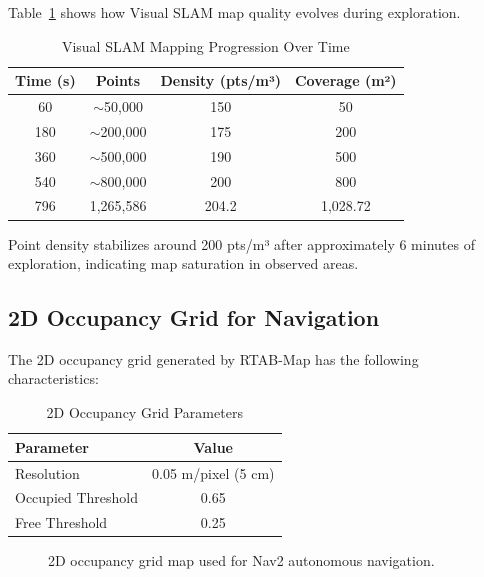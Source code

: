 \documentclass[conference]{IEEEtran}
\begin{document}
Table~\ref{tab:progression} shows how Visual SLAM map quality evolves during exploration.

\begin{table}[htbp]
\caption{Visual SLAM Mapping Progression Over Time}
\begin{center}
\begin{tabular}{|c|c|c|c|}
\hline
\textbf{Time (s)} & \textbf{Points} & \textbf{Density (pts/m³)} & \textbf{Coverage (m²)} \\
\hline
60 & $\sim$50,000 & 150 & 50 \\
180 & $\sim$200,000 & 175 & 200 \\
360 & $\sim$500,000 & 190 & 500 \\
540 & $\sim$800,000 & 200 & 800 \\
796 & 1,265,586 & 204.2 & 1,028.72 \\
\hline
\end{tabular}
\label{tab:progression}
\end{center}
\end{table}

Point density stabilizes around 200 pts/m³ after approximately 6 minutes of exploration, indicating map saturation in observed areas.

\subsection{2D Occupancy Grid for Navigation}

The 2D occupancy grid generated by RTAB-Map has the following characteristics:

\begin{table}[htbp]
\caption{2D Occupancy Grid Parameters}
\begin{center}
\begin{tabular}{|l|c|}
\hline
\textbf{Parameter} & \textbf{Value} \\
\hline
Resolution & 0.05 m/pixel (5 cm) \\
Occupied Threshold & 0.65 \\
Free Threshold & 0.25 \\
\hline
\end{tabular}
\label{tab:occupancy}
\end{center}
\end{table}

\begin{figure}[htbp]
\centerline{
}
\caption{2D occupancy grid map used for Nav2 autonomous navigation.}
\label{fig:occupancy}
\end{figure}
\end{document}
